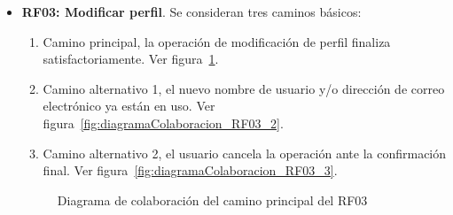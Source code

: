 \begin{itemize}
	\FloatBarrier
	\item \textbf{RF03: Modificar perfil}. Se consideran tres caminos básicos: 
	\begin{enumerate}
		\item Camino principal, la operación de modificación de perfil finaliza satisfactoriamente. Ver figura~\ref{fig:diagramaColaboracion_RF03_1}.
		\item Camino alternativo 1, el nuevo nombre de usuario y/o dirección de correo electrónico ya están en uso. Ver figura~\ref{fig:diagramaColaboracion_RF03_2}.
		\item Camino alternativo 2, el usuario cancela la operación ante la confirmación final. Ver figura~\ref{fig:diagramaColaboracion_RF03_3}.
	\end{enumerate}
	\begin{figure} [!htb]
		\centering
		\caption{Diagrama de colaboración del camino principal del RF03}
		\label{fig:diagramaColaboracion_RF03_1}
	\end{figure}
	\begin{figure} [!htb]
		\centering

\end{figure}
\end{itemize}
